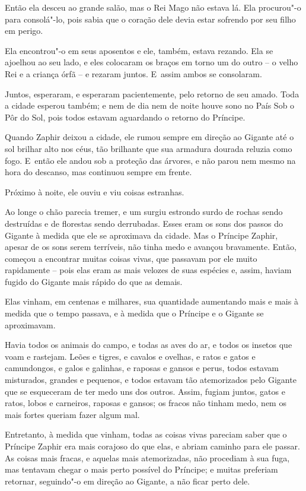 Então ela desceu ao grande salão, mas o Rei Mago não estava lá. Ela
procurou"-o para consolá"-lo, pois sabia que o coração dele devia estar
sofrendo por seu filho em perigo.

Ela encontrou"-o em seus aposentos e ele, também, estava rezando. Ela se
ajoelhou ao seu lado, e eles colocaram os braços em torno um do outro --
o velho Rei e a criança órfã -- e rezaram juntos. E~assim ambos se
consolaram.



Juntos, esperaram, e esperaram pacientemente, pelo retorno de seu amado.
Toda a cidade esperou também; e nem de dia nem de noite houve sono no
País Sob o Pôr do Sol, pois todos estavam aguardando o retorno do
Príncipe.

Quando Zaphir deixou a cidade, ele rumou sempre em direção ao Gigante
até o sol brilhar alto nos céus, tão brilhante que sua armadura dourada
reluzia como fogo. E~então ele andou sob a proteção das árvores, e não
parou nem mesmo na hora do descanso, mas continuou sempre em frente.

Próximo à noite, ele ouviu e viu coisas estranhas.

Ao longe o chão parecia tremer, e um surgiu estrondo surdo de rochas
sendo destruídas e de florestas sendo derrubadas. Esses eram os sons dos
passos do Gigante à medida que ele se aproximava da cidade. Mas o
Príncipe Zaphir, apesar de os sons serem terríveis, não tinha medo e
avançou bravamente. Então, começou a encontrar muitas coisas vivas, que
passavam por ele muito rapidamente -- pois elas eram as mais velozes de
suas espécies e, assim, haviam fugido do Gigante mais rápido do que as
demais.

Elas vinham, em centenas e milhares, sua quantidade aumentando mais e
mais à medida que o tempo passava, e à medida que o Príncipe e o Gigante
se aproximavam.

Havia todos os animais do campo, e todas as aves do ar, e todos os
insetos que voam e rastejam. Leões e tigres, e cavalos e ovelhas, e
ratos e gatos e camundongos, e galos e galinhas, e raposas e gansos e
perus, todos estavam misturados, grandes e pequenos, e todos estavam tão
atemorizados pelo Gigante que se esqueceram de ter medo uns dos outros.
Assim, fugiam juntos, gatos e ratos, lobos e carneiros, raposas e
gansos; os fracos não tinham medo, nem os mais fortes queriam fazer
algum mal.

Entretanto, à medida que vinham, todas as coisas vivas pareciam saber
que o Príncipe Zaphir era mais corajoso do que elas, e abriam caminho
para ele passar. As coisas mais fracas, e aquelas mais atemorizadas, não
procediam à sua fuga, mas tentavam chegar o mais perto possível do
Príncipe; e muitas preferiam retornar, seguindo"-o em direção ao Gigante,
a não ficar perto dele.

